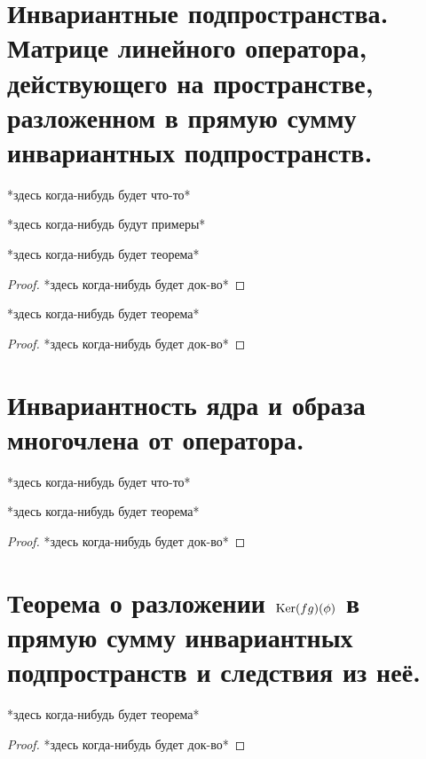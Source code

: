 \documentclass[12pt, fleqn]{article}
\begin{document}
  \section{Инвариантные подпространства. Матрице линейного оператора, действующего на пространстве, разложенном в прямую сумму инвариантных подпространств.}
  *здесь когда-нибудь будет что-то*
  \begin{examples}
    *здесь когда-нибудь будут примеры*
  \end{examples}

  \begin{theorem}[1]
    *здесь когда-нибудь будет теорема*
  \end{theorem}

  \begin{proof}
    *здесь когда-нибудь будет док-во*
  \end{proof}

  \begin{theorem}[2]
    *здесь когда-нибудь будет теорема*
  \end{theorem}

  \begin{proof}
    *здесь когда-нибудь будет док-во*
  \end{proof}

  \section{Инвариантность ядра и образа многочлена от оператора.}
  *здесь когда-нибудь будет что-то*
  \begin{theorem}
    *здесь когда-нибудь будет теорема*
  \end{theorem}

  \begin{proof}
    *здесь когда-нибудь будет док-во*
  \end{proof}

  \section{Теорема о разложении $\mathop{\rm Ker}\nolimits(f g)(\phi)$ в прямую сумму инвариантных подпространств и следствия из неё.}

  \begin{theorem}
    *здесь когда-нибудь будет теорема*
  \end{theorem}

  \begin{proof}
    *здесь когда-нибудь будет док-во*
  \end{proof}
\end{document}
